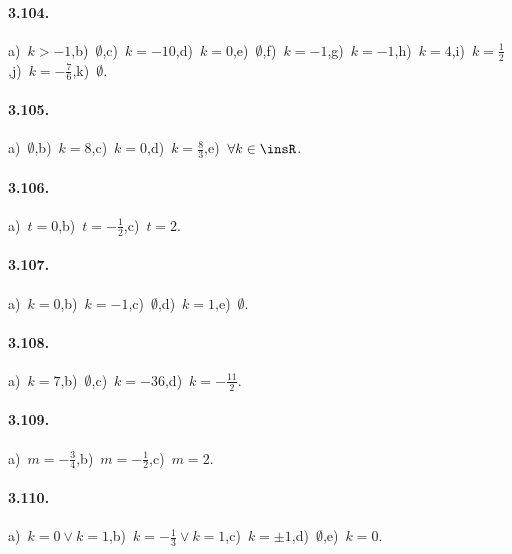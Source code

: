 
\paragraph{3.104.} a)~$k >-1$,\quad b)~$\emptyset$,\quad c)~$k =-10$,\quad d)~$k = 0$,\quad e)~$ \emptyset $,\quad f)~$ k =-1 $,\quad g)~$ k =-1 $,\quad h)~$ k = 4 $,\quad i)~$ k = \frac{1}{2} $,\quad j)~$ k =-\frac{7}{6} $,\quad k)~$\emptyset$.

\paragraph{3.105.} a)~$\emptyset $,\quad b)~$k = 8 $,\quad c)~$ k = 0$,\quad d)~$k = \frac{8}{3} $,\quad e)~$\forall k \in \insR$.

\paragraph{3.106.} a)~$t=0$,\quad b)~$t=-\frac{1}{2}$,\quad c)~$t=2$.

\paragraph{3.107.} a)~$ k = 0 $,\quad b)~$ k =-1 $,\quad c)~$ \emptyset $,\quad d)~$ k = 1 $,\quad e)~$ \emptyset $.

\paragraph{3.108.} a)~$ k = 7 $,\quad b)~$ \emptyset $,\quad c)~$ k =-36 $,\quad d)~$ k =-\frac{11}{2} $.

\paragraph{3.109.} a)~$m=-\frac{3}{4}$,\quad b)~$m=-\frac{1}{2}$,\quad c)~$m=2$.

\paragraph{3.110.} a)~$ k = 0 \vee k = 1 $,\quad b)~$ k =-\frac{1}{3} \vee k = 1 $,\quad c)~$ k = \pm 1 $,\quad d)~$ \emptyset $,\quad e)~$ k=0 $.

